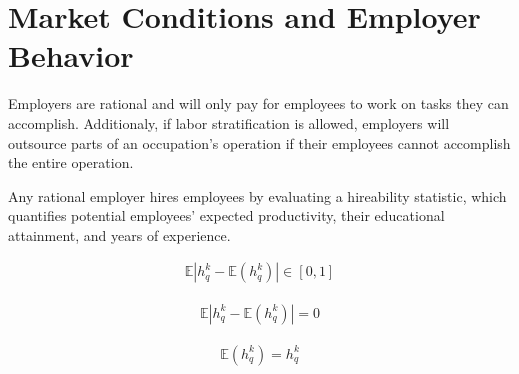 \documentclass[hidelinks, nonatbib]{elsarticle}
\begin{document}
\section{Market Conditions and Employer Behavior}
\begin{axiom}
    \label{era}
    Employers are rational and will only pay for employees to work on tasks they can accomplish. Additionaly, if labor stratification is allowed, employers will outsource parts of an occupation's operation if their employees cannot accomplish the entire operation.
\end{axiom}
\begin{axiom}
    \label{ha}
    Any rational employer hires employees by evaluating a hireability statistic, which quantifies potential employees' expected productivity, their educational attainment, and years of experience.

    \begin{subaxiom}
        \begin{gather}
            \mathbb{E}
                \left| 
                    h_{q}^{k} - 
                    \mathbb{E}(h_{q}^{k})
                \right| 
            \in [0,1]
        \end{gather}
    \end{subaxiom}
    
    \begin{subaxiom}
        \begin{gather}
            \mathbb{E}
                \left| 
                    h_{q}^{k} - 
                    \mathbb{E}(h_{q}^{k})
                \right| 
            = 0
        \end{gather}
    \end{subaxiom}
    
    \begin{subaxiom}
        \begin{gather}
            \mathbb{E}(h_{q}^{k}) = h_{q}^{k}
        \end{gather}
    \end{subaxiom}
\end{axiom}
\end{document}
